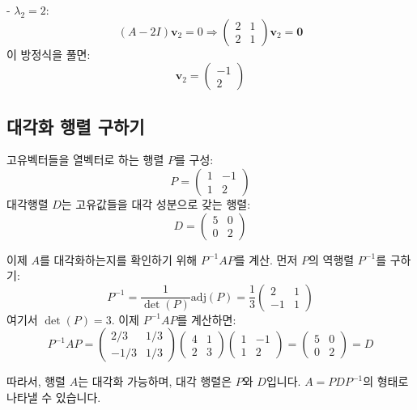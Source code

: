 \documentclass{article}
\begin{document}
   - \(\lambda_2 = 2\):
     \[
     (A - 2I) \mathbf{v}_2 = 0 \Rightarrow \begin{pmatrix}
     2 & 1 \\
     2 & 1
     \end{pmatrix} \mathbf{v}_2 = \mathbf{0}
     \]
     이 방정식을 풀면:
     \[
     \mathbf{v}_2 = \begin{pmatrix} -1 \\ 2 \end{pmatrix}
     \]

\subsection{대각화 행렬 구하기}


   고유벡터들을 열벡터로 하는 행렬 \(P\)를 구성:
   \[
   P = \begin{pmatrix}
   1 & -1 \\
   1 & 2
   \end{pmatrix}
   \]
   대각행렬 \(D\)는 고유값들을 대각 성분으로 갖는 행렬:
   \[
   D = \begin{pmatrix}
   5 & 0 \\
   0 & 2
   \end{pmatrix}
   \]

   이제 \(A\)를 대각화하는지를 확인하기 위해 \(P^{-1}AP\)를 계산. 먼저 \(P\)의 역행렬 \(P^{-1}\)를 구하기:
   \[
   P^{-1} = \frac{1}{\det(P)} \text{adj}(P) = \frac{1}{3} \begin{pmatrix}
   2 & 1 \\
   -1 & 1
   \end{pmatrix}
   \]
   여기서 \(\det(P) = 3\). 이제 \(P^{-1}AP\)를 계산하면:
   \[
   P^{-1}AP = \begin{pmatrix}
   2/3 & 1/3 \\
   -1/3 & 1/3
   \end{pmatrix} \begin{pmatrix}
   4 & 1 \\
   2 & 3
   \end{pmatrix} \begin{pmatrix}
   1 & -1 \\
   1 & 2
   \end{pmatrix} = \begin{pmatrix}
   5 & 0 \\
   0 & 2
   \end{pmatrix} = D
   \]

따라서, 행렬 \(A\)는 대각화 가능하며, 대각 행렬은 \(P\)와 \(D\)입니다. \(A = PDP^{-1}\)의 형태로 나타낼 수 있습니다.
\end{document}
